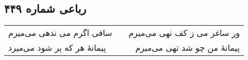 \begin{center}
\section*{رباعی شماره ۴۴۹}
\label{sec:sh449}
\begin{longtable}{l p{0.5cm} r}
ساقی اگرم می ندهی می‌میرم
&&
ور ساغر می ز کف نهی می‌میرم
\\
پیمانهٔ هر که پر شود می‌میرد
&&
پیمانهٔ من چو شد تهی می‌میرم
\\
\end{longtable}
\end{center}

